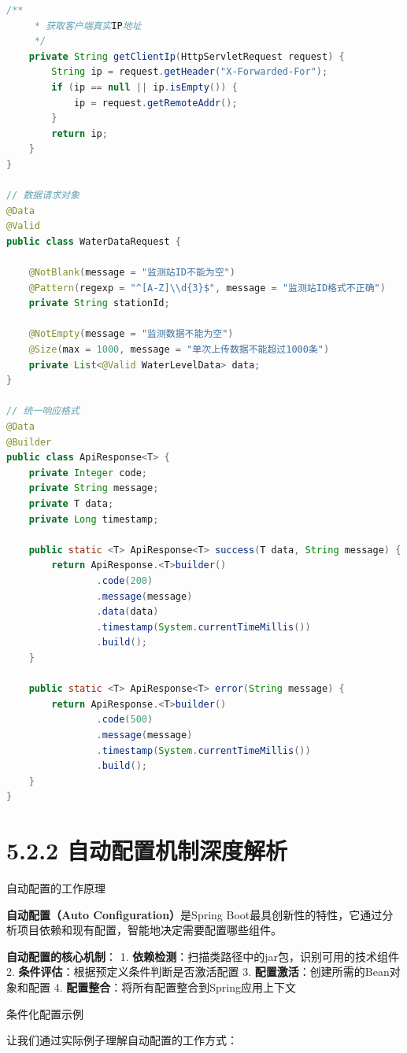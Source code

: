 \begin{lstlisting}[language=Java]
    /**
     * 获取客户端真实IP地址
     */
    private String getClientIp(HttpServletRequest request) {
        String ip = request.getHeader("X-Forwarded-For");
        if (ip == null || ip.isEmpty()) {
            ip = request.getRemoteAddr();
        }
        return ip;
    }
}

// 数据请求对象
@Data
@Valid
public class WaterDataRequest {
    
    @NotBlank(message = "监测站ID不能为空")
    @Pattern(regexp = "^[A-Z]\\d{3}$", message = "监测站ID格式不正确")
    private String stationId;
    
    @NotEmpty(message = "监测数据不能为空")
    @Size(max = 1000, message = "单次上传数据不能超过1000条")
    private List<@Valid WaterLevelData> data;
}

// 统一响应格式
@Data
@Builder
public class ApiResponse<T> {
    private Integer code;
    private String message;
    private T data;
    private Long timestamp;
    
    public static <T> ApiResponse<T> success(T data, String message) {
        return ApiResponse.<T>builder()
                .code(200)
                .message(message)
                .data(data)
                .timestamp(System.currentTimeMillis())
                .build();
    }
    
    public static <T> ApiResponse<T> error(String message) {
        return ApiResponse.<T>builder()
                .code(500)
                .message(message)
                .timestamp(System.currentTimeMillis())
                .build();
    }
}
\end{lstlisting}

\section{5.2.2 自动配置机制深度解析}

 自动配置的工作原理

\textbf{自动配置（Auto Configuration）}是Spring Boot最具创新性的特性，它通过分析项目依赖和现有配置，智能地决定需要配置哪些组件。

\textbf{自动配置的核心机制}： 1. \textbf{依赖检测}：扫描类路径中的jar包，识别可用的技术组件 2. \textbf{条件评估}：根据预定义条件判断是否激活配置 3. \textbf{配置激活}：创建所需的Bean对象和配置 4. \textbf{配置整合}：将所有配置整合到Spring应用上下文

 条件化配置示例

让我们通过实际例子理解自动配置的工作方式：

